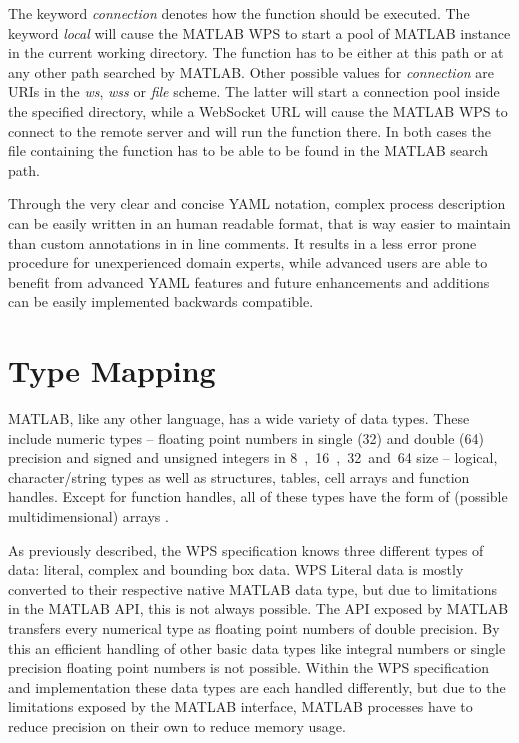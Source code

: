 		The keyword \emph{connection} denotes how the function should be executed. The keyword \emph{local} will cause the MATLAB WPS to start a pool of MATLAB instance in the current working directory. The function has to be either at this path or at any other path searched by MATLAB. Other possible values for \emph{connection} are URIs in the \emph{ws}, \emph{wss} or \emph{file} scheme. The latter will start a connection pool inside the specified directory, while a WebSocket URL will cause the MATLAB WPS to connect to the remote server and will run the function there. In both cases the file containing the function has to be able to be found in the MATLAB search path.

		Through the very clear and concise YAML notation, complex process description can be easily written in an human readable format, that is way easier to maintain than custom annotations in in line comments. It results in a less error prone procedure for unexperienced domain experts, while advanced users are able to benefit from advanced YAML features and future enhancements and additions can be easily implemented backwards compatible.
	\section{Type Mapping}
		\label{sec:matlab:type}
		MATLAB, like any other language, has a wide variety of data types. These include numeric types -- floating point numbers in single (\unit{32}{\bit}) and double (\unit{64}{\bit}) precision and signed and unsigned integers in \unit{8, 16, 32 and 64}{\bit} size -- logical, character/string types as well as structures, tables, cell arrays and function handles. Except for function handles, all of these types have the form of (possible multidimensional) arrays \citep{matlab}.

		As previously described, the \acl{WPS} specification knows three different types of data: literal, complex and bounding box data.
		\ac{WPS} Literal data is mostly converted to their respective native MATLAB data type, but due to limitations in the MATLAB \ac{API}, this is not always possible. The \ac{API} exposed by MATLAB transfers every numerical type as floating point numbers of double precision. By this an efficient handling of other basic data types like integral numbers or single precision floating point numbers is not possible. Within the WPS specification and implementation these data types are each handled differently, but due to the limitations exposed by the MATLAB interface, MATLAB processes have to reduce precision on their own to reduce memory usage.

